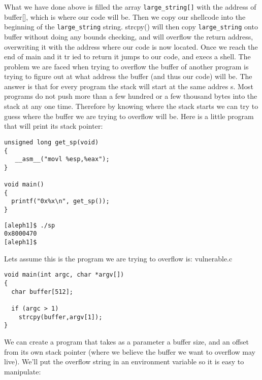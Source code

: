 \documentclass[12pt]{article}
\begin{document}
What we have done above is filled the array \verb+large_string[]+ with the address of buffer[], which is where our code 
will be. Then we copy our shellcode into the beginning of the \verb+large_string+ string. strcpy() will then copy 
\verb+large_string+ onto buffer without doing any bounds checking, and will overflow the return address, overwriting it 
with the address where our code  is now located.  Once we reach the end of main and it tr ied to return it jumps to 
our code, and execs a shell. The problem we are faced when trying to overflow the buffer of another program is 
trying to figure out at what address the buffer (and thus our code) will be. The answer is that for every program 
the stack will start at the same addres s. Most programs do not push more than a few hundred or a few thousand 
bytes into the stack at any one time. Therefore by knowing where  the stack starts we can try to guess where  the 
buffer we are trying to overflow will be. Here is a little program that will print its stack pointer: 


\begin{lstlisting}[caption=sp.c]
unsigned long get_sp(void) 
{
   __asm__("movl %esp,%eax");
}

void main() 
{
  printf("0x%x\n", get_sp());
}
\end{lstlisting}
\begin{verbatim}
[aleph1]$ ./sp
0x8000470
[aleph1]$
\end{verbatim}
Lets assume this is the program we are trying to overflow is: vulnerable.c 
\begin{lstlisting}[caption=vulnerable.c]
void main(int argc, char *argv[]) 
{
  char buffer[512];

  if (argc > 1)
    strcpy(buffer,argv[1]);
}
\end{lstlisting}
We can create a program that takes as a parameter a buffer size, and an offset from its own stack pointer
(where we believe the buffer we want to overflow may live). We'll put the overflow string in an environment variable 
so it is easy to manipulate: 
\end{document}

